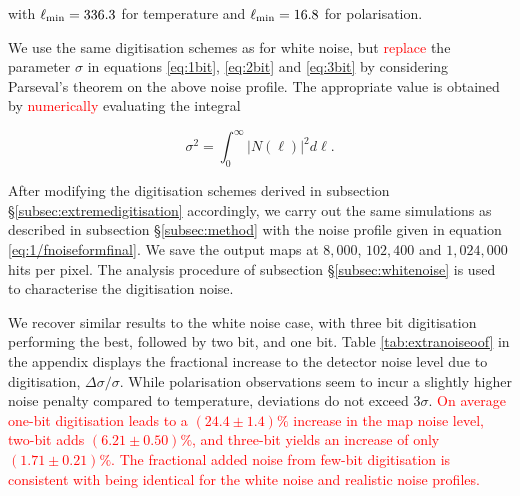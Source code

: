 \documentclass[apj]{emulateapj}
\newcommand{\lcut}{\ensuremath{\ell_{\rm min}}}
\newcommand{\changed}[1]{\textcolor{Red}{#1}}
\begin{document}
with $\lcut = 336.3$ for temperature and $\lcut = 16.8$ for polarisation.

We use the same digitisation schemes as for white noise, but \changed{replace} the parameter $\sigma$ in equations \ref{eq:1bit}, \ref{eq:2bit} and \ref{eq:3bit} by considering Parseval's theorem on the above noise profile. The appropriate value is obtained by \changed{numerically} evaluating the integral

\begin{equation} \label{eq:psvl1/f}
\sigma^2 = \int_0^\infty \left| N(\ell) \right|^2 d\ell.
\end{equation}

After modifying the digitisation schemes derived in subsection \S\ref{subsec:extremedigitisation} accordingly, we carry out the same simulations as described in subsection \S\ref{subsec:method} with the noise profile given in equation \ref{eq:1/fnoiseformfinal}. We save the output maps at $8,000$, $102,400$ and $1,024,000$ hits per pixel. The analysis procedure of subsection \S\ref{subsec:whitenoise} is used to characterise the digitisation noise.


We recover similar results to the white noise case, with three bit digitisation performing the best, followed by two bit, and one bit. Table \ref{tab:extranoiseoof} in the appendix displays the fractional increase to the detector noise level due to digitisation, $\Delta \sigma / \sigma$. While polarisation observations seem to incur a slightly higher noise penalty compared to temperature, deviations do not exceed $3\sigma$. \changed{On average one-bit digitisation leads to a $(24.4\pm 1.4)\%$ increase in the map noise level, two-bit adds $(6.21\pm0.50)\%$, and three-bit yields an increase of only $(1.71\pm0.21)\%$. 
The fractional added noise from few-bit digitisation is consistent with being identical for the white noise and realistic noise profiles.}
\end{document}
